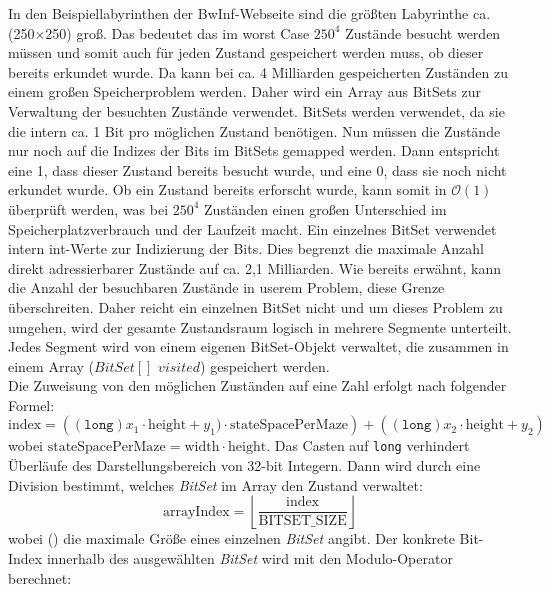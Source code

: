 \documentclass[a4paper,10pt,ngerman]{scrartcl}
\begin{document}
\begin{enumerate}
\begin{enumerate}
        In den Beispiellabyrinthen der BwInf-Webseite sind die größten Labyrinthe ca. (250×250) groß. Das bedeutet das im worst Case $250^{4}$ Zustände besucht werden müssen und somit auch für jeden Zustand gespeichert werden muss, ob dieser bereits erkundet wurde. Da kann bei ca. 4 Milliarden gespeicherten Zuständen zu einem großen Speicherproblem werden. Daher wird ein Array aus BitSets zur Verwaltung der besuchten Zustände verwendet. BitSets werden verwendet, da sie die intern ca. 1 Bit pro möglichen Zustand benötigen. Nun müssen die Zustände nur noch auf die Indizes der Bits im BitSets gemapped werden. Dann entspricht eine 1, dass dieser Zustand bereits besucht wurde, und eine 0, dass sie noch nicht erkundet wurde. Ob ein Zustand bereits erforscht wurde, kann somit in $\mathcal{O}(1)$ überprüft werden, was bei $250^{4}$ Zuständen einen großen Unterschied im Speicherplatzverbrauch und der Laufzeit macht. Ein einzelnes BitSet verwendet intern int-Werte zur Indizierung der Bits. Dies begrenzt die maximale Anzahl direkt adressierbarer Zustände auf ca. 2,1 Milliarden. Wie bereits erwähnt, kann die Anzahl der besuchbaren Zustände in userem Problem, diese Grenze überschreiten. Daher reicht ein einzelnen BitSet nicht und um dieses Problem zu umgehen, wird der gesamte Zustandsraum logisch in mehrere Segmente unterteilt. Jedes Segment wird von einem eigenen BitSet-Objekt verwaltet, die zusammen in einem Array ($BitSet[]$ $visited$) gespeichert werden. 
        \\
        Die Zuweisung von den möglichen Zuständen auf eine Zahl erfolgt nach folgender Formel:
        \begin{equation}
          \text{index} = \left( (\texttt{long}) x_1 \cdot \text{height} + y_1) \cdot \text{stateSpacePerMaze} \right) + ((\texttt{long}) x_2 \cdot \text{height} + y_2)
  \label{3}
        \end{equation}
        wobei $\text{stateSpacePerMaze} = \text{width} \cdot \text{height}.$ Das Casten auf \texttt{long} verhindert Überläufe des Darstellungsbereich von 32-bit Integern. Dann wird durch eine Division bestimmt, welches \textit{BitSet} im Array den Zustand verwaltet:
        \begin{equation}
          \text{arrayIndex} = \left\lfloor \frac{\text{index}}{\text{BITSET\_SIZE}} \right\rfloor
  \label{4}
        \end{equation}
        wobei () die maximale Größe eines einzelnen \textit{BitSet} angibt. 
        Der konkrete Bit-Index innerhalb des ausgewählten \textit{BitSet} wird mit den Modulo-Operator berechnet: 

\end{enumerate}
\end{enumerate}
\end{document}
